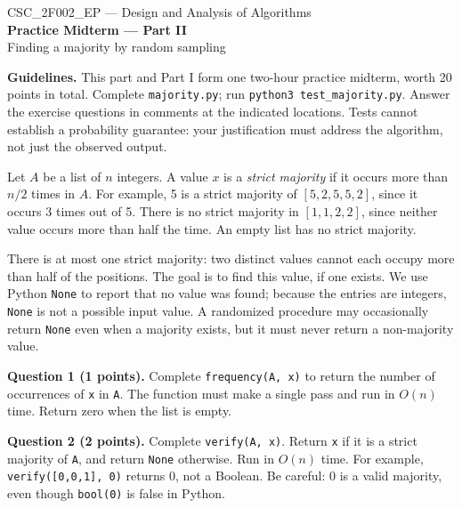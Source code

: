 \documentclass[11pt,a4paper]{article}
\newcommand{\code}[1]{\texttt{#1}}
\newcommand{\q}[2]{\medskip\noindent\textbf{Question #1 (#2 points).} }
\begin{document}
\begin{center}{\large CSC\_2F002\_EP --- Design and Analysis of Algorithms}\\[3pt]
{\Large\bfseries Practice Midterm --- Part II}\\[3pt]{\large Finding a majority by random sampling}\end{center}
\textbf{Guidelines.} This part and Part I form one two-hour practice midterm, worth 20 points in total. Complete \code{majority.py}; run \code{python3 test\_majority.py}. Answer the exercise questions in comments at the indicated locations. Tests cannot establish a probability guarantee: your justification must address the algorithm, not just the observed output.

Let \(A\) be a list of \(n\) integers. A value \(x\) is a \emph{strict majority} if it occurs more than \(n/2\) times in \(A\). For example, 5 is a strict majority of \([5,2,5,5,2]\), since it occurs 3 times out of 5. There is no strict majority in \([1,1,2,2]\), since neither value occurs more than half the time. An empty list has no strict majority.

There is at most one strict majority: two distinct values cannot each occupy more than half of the positions. The goal is to find this value, if one exists. We use Python \code{None} to report that no value was found; because the entries are integers, \code{None} is not a possible input value. A randomized procedure may occasionally return \code{None} even when a majority exists, but it must never return a non-majority value.

\q{1}{1} Complete \code{frequency(A, x)} to return the number of occurrences of \code{x} in \code{A}. The function must make a single pass and run in \(O(n)\) time. Return zero when the list is empty.

\q{2}{2} Complete \code{verify(A, x)}. Return \code{x} if it is a strict majority of \code{A}, and return \code{None} otherwise. Run in \(O(n)\) time. For example, \code{verify([0,0,1], 0)} returns 0, not a Boolean. Be careful: 0 is a valid majority, even though \code{bool(0)} is false in Python.
\end{document}
